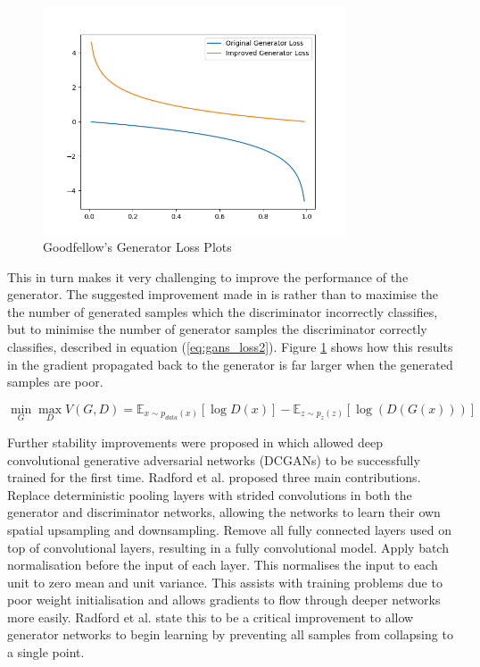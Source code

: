 \documentclass[12pt]{article}
\begin{document}
\begin{figure}[h]
    \centering
        \includegraphics[width=0.8\textwidth]{../figures/goodfellow_gen_losses.png}
    \caption{Goodfellow's Generator Loss Plots \cite{Goodfellow2014}}\label{fig:Goodfellow_plot}
\end{figure}

\noindent This in turn makes it very challenging to improve the performance of the generator.
The suggested improvement made in \cite{Goodfellow2014} is rather than to maximise the the number of generated samples which the discriminator incorrectly classifies, but to minimise the number of generator samples the discriminator correctly classifies, described in equation (\ref{eq:gans_loss2}).
Figure \ref{fig:Goodfellow_plot} shows how this results in the gradient propagated back to the generator is far larger when the generated samples are poor.

\begin{equation} \label{eq:gans_loss2}
    \min_{G} \max_{D} V(G, D) = \mathbb{E}_{x \sim p_{data}(x)} [\log D(x)]
                              - \mathbb{E}_{z \sim p_{z}(z)} [\log (D(G(x)))]
\end{equation}

Further stability improvements were proposed in \cite{Radford2016} which allowed deep convolutional generative adversarial networks (DCGANs) to be successfully trained for the first time.
Radford et al. proposed three main contributions.
Replace deterministic pooling layers with strided convolutions in both the generator and discriminator networks, allowing the networks to learn their own spatial upsampling and downsampling.
Remove all fully connected layers used on top of convolutional layers, resulting in a fully convolutional model.
Apply batch normalisation \cite{Ioffe2015} before the input of each layer.
This normalises the input to each unit to zero mean and unit variance.
This assists with training problems due to poor weight initialisation and allows gradients to flow through deeper networks more easily.
Radford et al. state this to be a critical improvement to allow generator networks to begin learning by preventing all samples from collapsing to a single point. 
\end{document}
